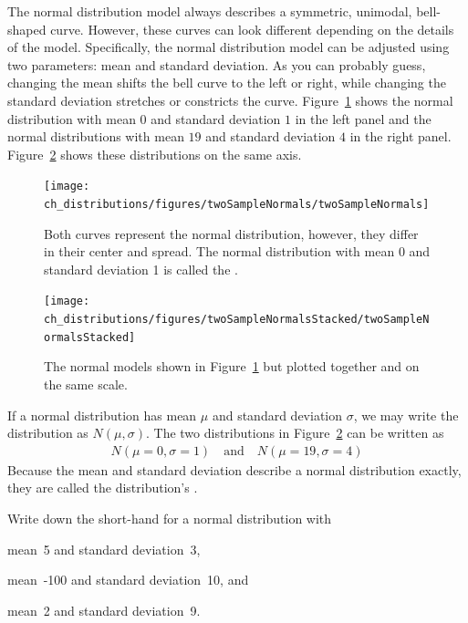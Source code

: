 The normal distribution model always describes a symmetric, unimodal, bell-shaped curve. However, these curves can look different depending on the details of the model. Specifically, the normal distribution model can be adjusted using two parameters: mean and standard deviation. As you can probably guess, changing the mean shifts the bell curve to the left or right, while changing the standard deviation stretches or constricts the curve. Figure~\ref{twoSampleNormals} shows the normal distribution with mean $0$ and standard deviation $1$ in the left panel and the normal distributions with mean $19$ and standard deviation $4$ in the right panel. Figure~\ref{twoSampleNormalsStacked} shows these distributions on the same axis.

\begin{figure}[hht]
\centering
\texttt{[image: ch\_distributions/figures/twoSampleNormals/twoSampleNormals]}
\caption{Both curves represent the normal distribution, however, they differ in their center and spread. The normal distribution with mean 0 and standard deviation 1 is called the .}
\label{twoSampleNormals}
\end{figure}

\begin{figure}[hht]
\centering
\texttt{[image: ch\_distributions/figures/twoSampleNormalsStacked/twoSampleNormalsStacked]}
\caption{The normal models shown in Figure~\ref{twoSampleNormals} but plotted together and on the same scale.}
\label{twoSampleNormalsStacked}
\end{figure}

If a normal distribution has mean $\mu$ and standard deviation $\sigma$, we may write the distribution as $N(\mu, \sigma)$.
The two distributions in Figure~\ref{twoSampleNormalsStacked} can be written as
\begin{align*}
N(\mu=0,\sigma=1)\quad\text{and}\quad N(\mu=19,\sigma=4)
\end{align*}
Because the mean and standard deviation describe a normal distribution exactly, they are called the distribution's .

\begin{exercisewrap}
\begin{nexercise}
Write down the short-hand for a normal distribution with\footnotemark
\begin{parts}
\item mean~5 and standard deviation~3,
\item mean~-100 and standard deviation~10, and
\item mean~2 and standard deviation~9.
\end{parts}
\end{nexercise}
\end{exercisewrap}

